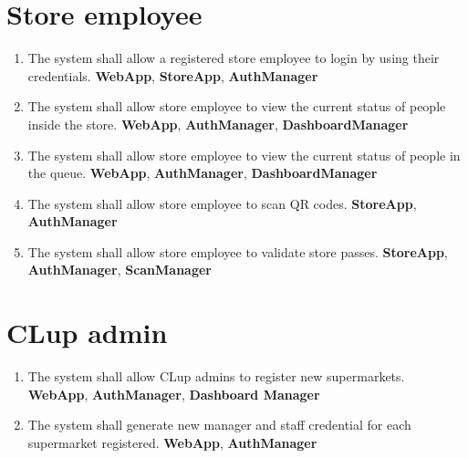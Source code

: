 \section{Store employee}
\begin{enumerate}[resume*=requirements]
	\item The system shall allow a registered store employee to login by using their credentials.
	\newline\textbf{WebApp}, \textbf{StoreApp}, \textbf{AuthManager}
	\item The system shall allow store employee to view the current status of people inside the store.
	\newline\textbf{WebApp}, \textbf{AuthManager}, \textbf{DashboardManager}
	\item The system shall allow store employee to view the current status of people in the queue.
	\newline\textbf{WebApp}, \textbf{AuthManager}, \textbf{DashboardManager}
	\item The system shall allow store employee to scan QR codes.
	\newline\textbf{StoreApp}, \textbf{AuthManager}
	\item The system shall allow store employee to validate store passes.
	\newline\textbf{StoreApp}, \textbf{AuthManager}, \textbf{ScanManager}
\end{enumerate}

\section{CLup admin}
\begin{enumerate}[resume*=requirements]
	\item The system shall allow CLup admins to register new supermarkets.
	\newline\textbf{WebApp}, \textbf{AuthManager}, \textbf{Dashboard Manager}
	\item The system shall generate new manager and staff credential for each supermarket registered.
	\newline\textbf{WebApp}, \textbf{AuthManager}
\end{enumerate}